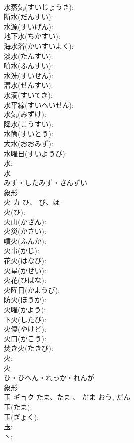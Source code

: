 \documentclass[8pt]{extreport}
\begin{document}
\begin{CJK}{UTF8}{min}
\\	水蒸気(すいじょうき): 
\\	断水(だんすい): 
\\	水源(すいげん): 
\\	地下水(ちかすい): 
\\	海水浴(かいすいよく): 
\\	淡水(たんすい): 
\\	噴水(ふんすい): 
\\	水洗(すいせん): 
\\	潜水(せんすい): 
\\	水滴(すいてき): 
\\	水平線(すいへいせん): 
\\	水気(みずけ): 
\\	降水(こうすい): 
\\	水筒(すいとう): 
\\	大水(おおみず): 
\\	水曜日(すいようび): 
\\	水: 
\\	水	
\\	みず・したみず・さんずい	
\\	象形 
\\	火	カ	ひ、-び、ほ-		
\\	火(ひ): 
\\	火山(かざん): 
\\	火災(かさい): 
\\	噴火(ふんか): 
\\	火事(かじ): 
\\	花火(はなび): 
\\	火星(かせい): 
\\	火花(ひばな): 
\\	火曜日(かようび): 
\\	防火(ぼうか): 
\\	火曜(かよう): 
\\	下火(したび): 
\\	火傷(やけど): 
\\	火口(かこう): 
\\	焚き火(たきび): 
\\	火: 
\\	火	
\\	ひ・ひへん・れっか・れんが	
\\	象形 
\\	玉	ギョク	たま、たま-、-だま	おう, だん	
\\	玉(たま): 
\\	玉(ぎょく): 
\\	玉: 
\\	丶: 

\end{CJK}
\end{document}
